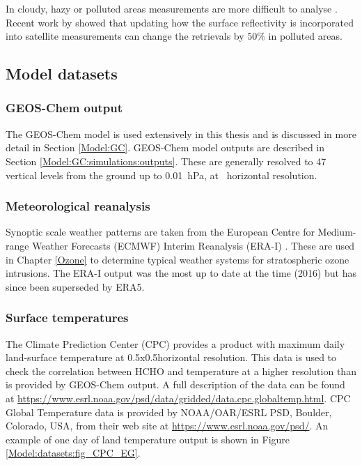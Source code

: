       In cloudy, hazy or polluted areas measurements are more difficult to analyse \parencite[e.g.,][]{Palmer2003,Marais2014}.
      Recent work by \textcite{Vasilkov2017} showed that updating how the surface reflectivity is incorporated into satellite measurements can change the retrievals by $50\%$ in polluted areas.
      
  \subsection{Model datasets}
    
    \subsubsection{GEOS-Chem output}
      
      The GEOS-Chem model is used extensively in this thesis and is discussed in more detail in Section \ref{Model:GC}.
      GEOS-Chem model outputs are described in Section \ref{Model:GC:simulations:outputs}.
      These are generally resolved to 47 vertical levels from the ground up to 0.01~hPa, at \lowhr ~horizontal resolution.
    
    \subsubsection{Meteorological reanalysis}
      \label{Model:datasets:ERAI}
      
      Synoptic scale weather patterns are taken from the European Centre for Medium-range Weather Forecasts (ECMWF) Interim Reanalysis (ERA-I) \parencite{Dee2011}.
      These are used in Chapter \ref{Ozone} to determine typical weather systems for stratospheric ozone intrusions.
      The ERA-I output was the most up to date at the time (2016) but has since been superseded by ERA5.
    
    \subsubsection{Surface temperatures}
      The Climate Prediction Center (CPC) provides a product with maximum daily land-surface temperature at 0.5x0.5\degr  horizontal resolution. 
      This data is used to check the correlation between HCHO and temperature at a higher resolution than is provided by GEOS-Chem output.
      A full description of the data can be found at \url{https://www.esrl.noaa.gov/psd/data/gridded/data.cpc.globaltemp.html}.
      CPC Global Temperature data is provided by NOAA/OAR/ESRL PSD, Boulder, Colorado, USA, from their web site at \url{https://www.esrl.noaa.gov/psd/}.
      An example of one day of land temperature output is shown in Figure \ref{Model:datasets:fig_CPC_EG}.
      
